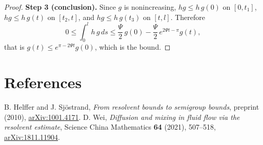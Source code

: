 \documentclass[11pt]{article}
\theoremstyle{definition}
\theoremstyle{remark}
\begin{document}
\begin{proof}
\textbf{Step 3 (conclusion).} Since $g$ is nonincreasing, $hg\leq h\,g(0)$ on $[0,t_1]$, $hg\leq h\,g(t)$ on $[t_2,t]$, and $hg\leq h\,g(t_3)$ on $[t,l]$. Therefore
\[0\leq\int_0^lh\,g\,ds\leq\frac{\Psi}{2}\,g(0)-\frac{\Psi}{2}\,e^{2\Psi t-\pi}g(t),\]
that is $g(t)\leq e^{\pi-2\Psi t}g(0)$, which is the bound.
\end{proof}


\section*{References}
\begin{thebibliography}{}
 B. Helffer and J. Sjöstrand, \emph{From resolvent bounds to semigroup bounds}, preprint (2010), \href{https://arxiv.org/abs/1001.4171}{arXiv:1001.4171}.
 D. Wei, \emph{Diffusion and mixing in fluid flow via the resolvent estimate}, Science China Mathematics \textbf{64} (2021), 507–518, \href{https://arxiv.org/abs/1811.11904}{arXiv:1811.11904}.
\end{thebibliography}
\end{document}
